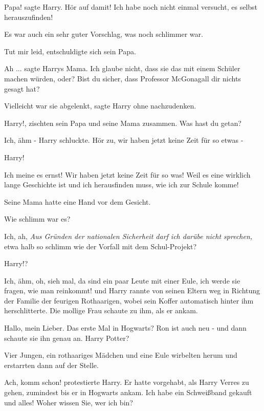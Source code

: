 \glqq{}Papa!\grqq{} sagte Harry. \glqq{}Hör auf damit! Ich habe noch nicht einmal
versucht, es selbst herauszufinden!\grqq{}

Es war auch ein sehr guter Vorschlag, was noch schlimmer war.

\glqq{}Tut mir leid\grqq{}, entschuldigte sich sein Papa.

\glqq{}Ah ...\grqq{} sagte Harrys Mama. \glqq{}Ich glaube nicht, dass sie das
mit einem Schüler machen würden, oder? Bist du sicher, dass Professor McGonagall
dir nichts gesagt hat?\grqq{}

\glqq{}Vielleicht war sie abgelenkt\grqq{}, sagte Harry ohne nachzudenken.

\glqq{}Harry!\grqq{}, zischten sein Papa und seine Mama zusammen. \glqq{}Was
hast du getan?\grqq{}

\glqq{}Ich, ähm -\grqq{} Harry schluckte. \glqq{}Hör zu, wir haben jetzt keine
Zeit für so etwas -\grqq{}

\glqq{}Harry!\grqq{}

\glqq{}Ich meine es ernst! Wir haben jetzt keine Zeit für so was! Weil es eine
wirklich lange Geschichte ist und ich herausfinden muss, wie ich zur Schule
komme!\grqq{}

Seine Mama hatte eine Hand vor dem Gesicht.

\glqq{}Wie schlimm war es?\grqq{}

\glqq{}Ich, ah\grqq{}, \emph{Aus Gründen der nationalen Sicherheit darf ich
darübe nicht sprechen,} \glqq{}etwa halb so schlimm wie der Vorfall mit dem
Schul-Projekt?\grqq{}

\glqq{}Harry!?\grqq{}

\glqq{}Ich, ähm, oh, sieh mal, da sind ein paar Leute mit einer Eule, ich werde
sie fragen, wie man reinkommt!\grqq{} und Harry rannte von seinen Eltern weg in
Richtung der Familie der feurigen Rothaarigen, wobei sein Koffer automatisch
hinter ihm herschlitterte. Die mollige Frau schaute zu ihm, als er ankam.

\glqq{}Hallo, mein Lieber. Das erste Mal in Hogwarts? Ron ist auch neu -\grqq{}
und dann schaute sie ihn genau an. \glqq{}Harry Potter?\grqq{}

Vier Jungen, ein rothaariges Mädchen und eine Eule wirbelten herum und
erstarrten dann auf der Stelle.

\glqq{}Ach, komm schon!\grqq{} protestierte Harry. Er hatte vorgehabt, als Harry
Verres zu gehen, zumindest bis er in Hogwarts ankam. \glqq{}Ich habe ein
Schweißband gekauft und alles! Woher wissen Sie, wer ich bin?\grqq{}

